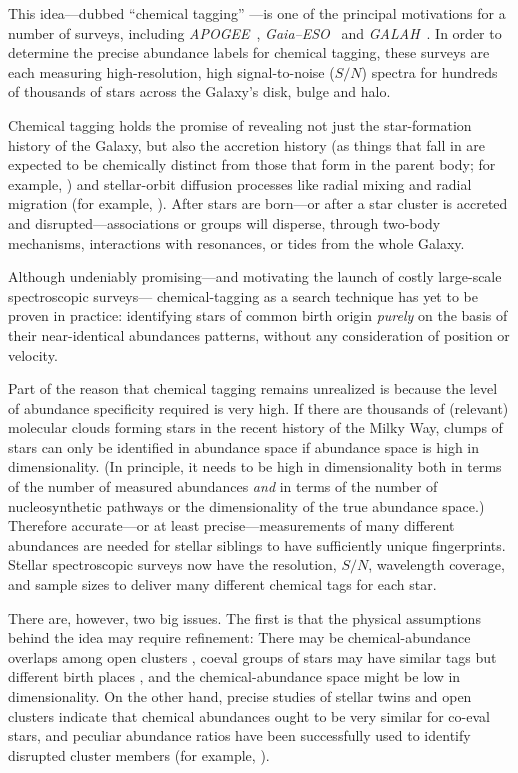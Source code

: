 \documentclass[manuscript, letterpaper]{aastex6}
\newcommand{\acronym}[1]{{\small{#1}}}
\newcommand{\project}[1]{\textsl{#1}}
\newcommand{\apogee}{\project{\acronym{APOGEE}}}
\newcommand{\gaiaeso}{\project{Gaia--\acronym{ESO}}}
\newcommand{\galah}{\project{\acronym{GALAH}}}
\begin{document}
This idea---dubbed ``chemical tagging''
\citep{freeman}---is one of the principal motivations for a number
of surveys, including \apogee\ \citep{apogee},
\gaiaeso\ \citep{gaiaeso} and \galah\ \citep{galah}.
In order to determine the precise abundance labels for chemical
tagging, these surveys are each measuring high-resolution, high
signal-to-noise ($S/N$) spectra for hundreds of thousands of stars across the
Galaxy's disk, bulge and halo.

Chemical tagging holds the promise of revealing not just the
star-formation history of the Galaxy, but also the accretion history
(as things that fall in are expected to be chemically distinct from
those that form in the parent body; for example, 
\citealt{eggen_1970,font,De_Silva_2007,bubar_king_2010}) and
stellar-orbit diffusion processes like radial mixing and radial
migration (for example, \citealt{roskar, quillen}).  After
stars are born---or after a star cluster is accreted and
disrupted---associations or groups will disperse, through
two-body mechanisms, interactions with resonances, or tides from the whole Galaxy.

Although undeniably promising---and motivating the 
launch of costly large-scale spectroscopic surveys---%
chemical-tagging as a search technique has yet to be proven in
practice: identifying stars of common birth origin {\it purely} on the
basis of their near-identical abundances patterns, without any
consideration of position or velocity.

Part of the reason that chemical tagging remains unrealized
is because the level of abundance specificity required
is very high.
If there are thousands of (relevant) molecular clouds forming stars in
the recent history of the Milky Way, clumps of stars can only be
identified in abundance space if abundance space is high in dimensionality.
(In principle, it needs to be high in dimensionality both in terms
of the number of measured abundances \emph{and} in terms of the number of
nucleosynthetic pathways or the dimensionality of the true abundance
space.)
Therefore accurate---or at
least precise---measurements of many different abundances are needed
for stellar siblings to have sufficiently unique fingerprints.
Stellar spectroscopic surveys now have the resolution,
$S/N$, wavelength coverage, and sample sizes to deliver many
different chemical tags for each star.

There are, however, two big issues.
The first is that the physical assumptions behind the idea may require
refinement:
There may be chemical-abundance overlaps among open clusters
\citep{blancocuaresma}, coeval groups of stars may have similar tags
but different birth places \citep{mitschang}, and the
chemical-abundance space might be low in dimensionality.
On the other hand, precise studies of stellar twins \citep{melendez, jofre}
and open clusters \citep{bovy} indicate that chemical abundances ought to be
very similar for co-eval stars, and peculiar abundance ratios
have been successfully used to identify disrupted cluster members (for example, \citealt{ocen}).
\end{document}
